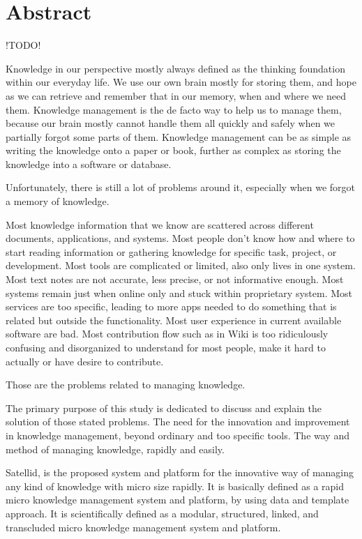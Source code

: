 \begingroup
\let\clearpage\relax
\let\cleardoublepage\relax
\let\cleardoublepage\relax

\chapter*{Abstract}

!TODO!

Knowledge in our perspective mostly always defined as the thinking foundation within our everyday life.
We use our own brain mostly for storing them, and hope as we can retrieve and remember that in our memory, when and where we need them.
Knowledge management is the de facto way to help us to manage them, because our brain mostly cannot handle them all quickly and safely when we partially forgot some parts of them.
Knowledge management can be as simple as writing the knowledge onto a paper or book, further as complex as storing the knowledge into a software or database.

Unfortunately, there is still a lot of problems around it, especially when we forgot a memory of knowledge.

Most knowledge information that we know are scattered across different documents, applications, and systems.
Most people don't know how and where to start reading information or gathering knowledge for specific task, project, or development.
Most tools are complicated or limited, also only lives in one system.
Most text notes are not accurate, less precise, or not informative enough.
Most systems remain just when online only and stuck within proprietary system.
Most services are too specific, leading to more apps needed to do something that is related but outside the functionality.
Most user experience in current available software are bad.
Most contribution flow such as in Wiki is too ridiculously confusing and disorganized to understand for most people, make it hard to actually or have desire to contribute.

Those are the problems related to managing knowledge.

The primary purpose of this study is dedicated to discuss and explain the solution of those stated problems.
The need for the innovation and improvement in knowledge management, beyond ordinary and too specific tools.
The way and method of managing knowledge, rapidly and easily.

Satellid, is the proposed system and platform for the innovative way of managing any kind of knowledge with micro size rapidly.
It is basically defined as a rapid micro knowledge management system and platform, by using data and template approach.
It is scientifically defined as a modular, structured, linked, and transcluded micro knowledge management system and platform.

